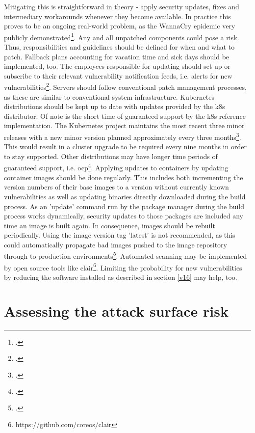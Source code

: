Mitigating this is straightforward in theory - apply security updates, fixes and intermediary workarounds whenever they become available.
In practice this proves to be an ongoing real-world problem, as the WannaCry epidemic very publicly demonstrated\footcite[][, p. 2]{wannaCryPatching}.
Any and all unpatched components could pose a risk. Thus, responsibilities and guidelines should be defined for when and what to patch. Fallback plans accounting for vacation time and sick days should be implemented, too. The employees responsible for updating should set up or subscribe to their relevant vulnerability notification feeds, i.e. alerts for new vulnerabilities\footcite[][, first paragraph]{azureAlerts}.
Servers should follow conventional patch management processes, as these are similar to conventional system infrastructure. Kubernetes distributions should be kept up to date with updates provided by the \gls{k8s} distributor. Of note is the short time of guaranteed support by the \gls{k8s} reference implementation. The Kubernetes project maintains the most recent three minor releases with a new minor version planned approximately every three months\footcite[][, section 'Supported versions']{k8sSupport}. This would result in a cluster upgrade to be required every nine months in order to stay supported. Other distributions may have longer time periods of guaranteed support, i.e. \gls{ocp}\footcite[][, section 'OpenShift Container Platform v3']{ocpSupport}.
Applying updates to containers by updating container images should be done regularly. This includes both incrementing the version numbers of their base images to a version without currently known vulnerabilities as well as updating binaries directly downloaded during the build process. As an 'update' command run by the package manager during the build process works dynamically, security updates to those packages are included any time an image is built again. In consequence, images should be rebuilt periodically.
Using the image version tag 'latest' is not recommended, as this could automatically propagate bad images pushed to the image repository through to production environments\footcite[][, p. 40]{k8sBook}. Automated scanning may be implemented by open source tools like clair\footnote{https://github.com/coreos/clair}. Limiting the probability for new vulnerabilities by reducing the software installed as described in section \ref{v16} may help, too.

\chapter{Assessing the attack surface risk}

